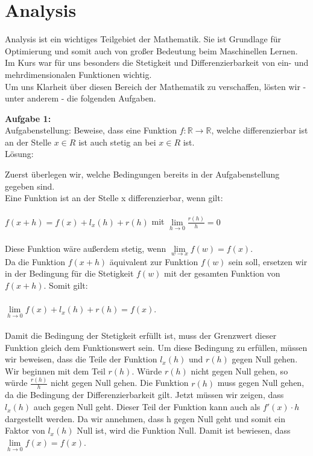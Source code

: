 \documentclass{article}
\begin{document}
\section{Analysis}


Analysis ist ein wichtiges Teilgebiet der Mathematik. Sie ist Grundlage für Optimierung und somit auch von großer Bedeutung beim Maschinellen Lernen. \\
Im Kurs war f\"ur uns besonders die Stetigkeit und Differenzierbarkeit von ein- und mehrdimensionalen Funktionen wichtig. \\
Um uns Klarheit \"uber diesen Bereich der Mathematik zu verschaffen, l\"osten wir - unter anderem - die folgenden Aufgaben.

\vspace{15pt}

\textbf{Aufgabe 1:} \\
Aufgabenstellung:
Beweise, dass eine Funktion $f:\mathds{R} \rightarrow \mathds{R}$, welche differenzierbar ist an der Stelle $x \in R$ ist auch stetig an bei $x \in R$ ist.\\ %

Lösung:

Zuerst überlegen wir, welche Bedingungen bereits in der Aufgabenstellung gegeben sind. \\
Eine Funktion ist an der Stelle x differenzierbar, wenn gilt:\\ \\

$f(x+h)=f(x)+l_x(h)+ r(h)$ mit $\lim\limits_{h \rightarrow 0} \frac{r(h)}{h}= 0$ \\ \\

Diese Funktion wäre außerdem stetig, wenn $\lim\limits_{w \rightarrow x} f(w)=f(x)$.\\
Da die Funktion $f(x+h)$ äquivalent zur Funktion $f(w)$ sein soll, ersetzen wir in der Bedingung für die Stetigkeit $f(w)$ mit der gesamten Funktion von $f(x+h)$.  
Somit gilt: \\ \\
$\lim\limits_{h \rightarrow 0} f(x)+l_x(h)+r(h)=f(x)$. \\ \\

Damit die Bedingung der Stetigkeit erfüllt ist, muss der Grenzwert dieser Funktion gleich dem Funktionswert sein. Um diese Bedingung zu erfüllen, müssen wir beweisen, dass die Teile der Funktion $l_x(h)$ und $r(h)$ gegen Null gehen. Wir beginnen mit dem Teil $r(h)$.  Würde $r(h)$ nicht gegen Null gehen, so würde $\frac{r(h)}{h}$ nicht gegen Null gehen. Die Funktion $r(h)$ muss gegen Null gehen, da die Bedingung der Differenzierbarkeit gilt. Jetzt müssen wir zeigen, dass $l_x(h)$ auch gegen Null geht. Dieser Teil der Funktion kann auch als $f'(x) \cdot h$ dargestellt werden. Da wir annehmen, dass h gegen Null geht und somit ein Faktor von $l_x(h)$ Null ist, wird die Funktion Null. Damit ist bewiesen, dass $\lim\limits_{h \rightarrow 0} f(x)=f(x)$. \\
\end{document}
